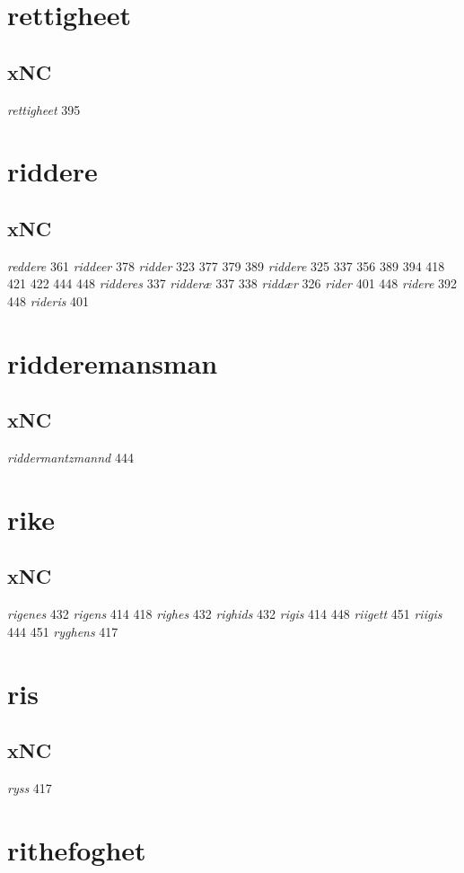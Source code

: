 \documentclass[a4paper,twocolumn]{article}
\begin{document}
\section{rettigheet}
\label{sec:org5fd144f}
\subsection{xNC}
\label{sec:org54ff651}
\emph{rettigheet} 395 
\section{riddere}
\label{sec:orgb2269f6}
\subsection{xNC}
\label{sec:org771c04e}
\emph{reddere} 361 \emph{riddeer} 378 \emph{ridder} 323 377 379 389 \emph{riddere} 325 337 356 389 394 418 421 422 444 448 \emph{ridderes} 337 \emph{ridderæ} 337 338 \emph{riddær} 326 \emph{rider} 401 448 \emph{ridere} 392 448 \emph{rideris} 401 
\section{ridderemansman}
\label{sec:org579a63f}
\subsection{xNC}
\label{sec:orgb1dd35d}
\emph{riddermantzmannd} 444 
\section{rike}
\label{sec:org80231b7}
\subsection{xNC}
\label{sec:orgce9648f}
\emph{rigenes} 432 \emph{rigens} 414 418 \emph{righes} 432 \emph{righids} 432 \emph{rigis} 414 448 \emph{riigett} 451 \emph{riigis} 444 451 \emph{ryghens} 417 
\section{ris}
\label{sec:org0517d1a}
\subsection{xNC}
\label{sec:org0469863}
\emph{ryss} 417 
\section{rithefoghet}
\label{sec:org3a5a306}
\end{document}
